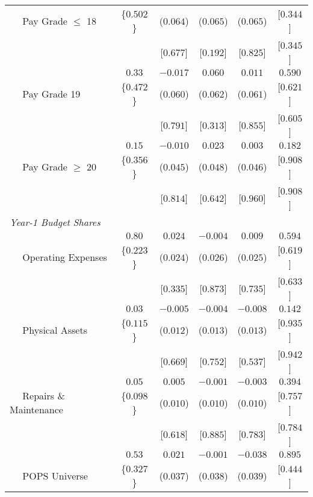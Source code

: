 \begin{longtable}{lccccc}
 $\quad$ Pay Grade $\leq$ 18  & \{$    0.502$\}  & ($    0.064$)  & ($    0.065$)  & ($    0.065$)  & [$    0.344$]  \\ 
 & & [$    0.677$]  & [$    0.192$]  & [$    0.825$]  & [$    0.345$]  \\ [0.5em] 
 & $     0.33$ & $   -0.017$ & $    0.060$ & $    0.011$ & $    0.590$ \\ 
 $\quad$ Pay Grade 19  & \{$    0.472$\}  & ($    0.060$)  & ($    0.062$)  & ($    0.061$)  & [$    0.621$]  \\ 
 & & [$    0.791$]  & [$    0.313$]  & [$    0.855$]  & [$    0.605$]  \\ [0.5em] 
 & $     0.15$ & $   -0.010$ & $    0.023$ & $    0.003$ & $    0.182$ \\ 
 $\quad$ Pay Grade $\geq$ 20  & \{$    0.356$\}  & ($    0.045$)  & ($    0.048$)  & ($    0.046$)  & [$    0.908$]  \\ 
 & & [$    0.814$]  & [$    0.642$]  & [$    0.960$]  & [$    0.908$]  \\ [0.5em] 
 \multicolumn{6}{l}{\textit{Year-1 Budget Shares}} \\ 
 & $     0.80$ & $    0.024$ & $   -0.004$ & $    0.009$ & $    0.594$ \\ 
 $\quad$ Operating Expenses  & \{$    0.223$\}  & ($    0.024$)  & ($    0.026$)  & ($    0.025$)  & [$    0.619$]  \\ 
 & & [$    0.335$]  & [$    0.873$]  & [$    0.735$]  & [$    0.633$]  \\ [0.5em] 
 & $     0.03$ & $   -0.005$ & $   -0.004$ & $   -0.008$ & $    0.142$ \\ 
 $\quad$ Physical Assets  & \{$    0.115$\}  & ($    0.012$)  & ($    0.013$)  & ($    0.013$)  & [$    0.935$]  \\ 
 & & [$    0.669$]  & [$    0.752$]  & [$    0.537$]  & [$    0.942$]  \\ [0.5em] 
 & $     0.05$ & $    0.005$ & $   -0.001$ & $   -0.003$ & $    0.394$ \\ 
 $\quad$ Repairs \& Maintenance  & \{$    0.098$\}  & ($    0.010$)  & ($    0.010$)  & ($    0.010$)  & [$    0.757$]  \\ 
 & & [$    0.618$]  & [$    0.885$]  & [$    0.783$]  & [$    0.784$]  \\ [0.5em] 
 & $     0.53$ & $    0.021$ & $   -0.001$ & $   -0.038$ & $    0.895$ \\ 
 $\quad$ POPS Universe  & \{$    0.327$\}  & ($    0.037$)  & ($    0.038$)  & ($    0.039$)  & [$    0.444$]  \\ 

\end{longtable}
